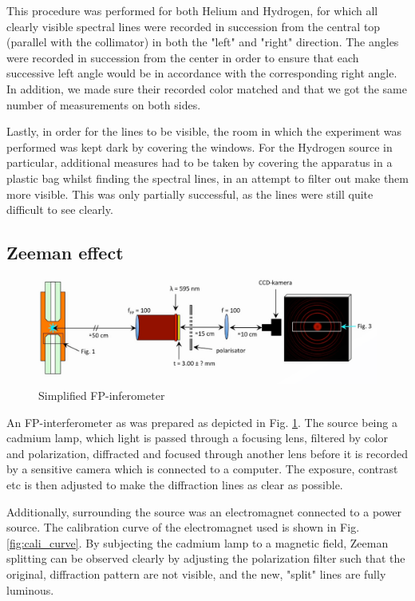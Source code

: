 \documentclass[11pt,a4paper]{article}
\begin{document}
    This procedure was performed for both Helium and Hydrogen, for which all clearly visible spectral lines were recorded in succession from the central top (parallel with the collimator) in both the "left" and "right" direction. The angles were recorded in succession from the center in order to ensure that each successive left angle would be in accordance with the corresponding right angle. In addition, we made sure their recorded color matched and that we got the same number of measurements on both sides.

    Lastly, in order for the lines to be visible, the room in which the experiment was performed was kept dark by covering the windows. For the Hydrogen source in particular, additional measures had to be taken by covering the apparatus in a plastic bag whilst finding the spectral lines, in an attempt to filter out make them more visible. This was only partially successful, as the lines were still quite difficult to see clearly.

    \subsection{Zeeman effect\label{sect:zeeman_expt}}
      \begin{figure}[H]
        \center
        \includegraphics[width=15cm]{scripts/figs/ZEEMAN_EXPERIMENTAL.png}
        \caption{Simplified FP-inferometer}
        \label{FP-inferometer}
      \end{figure}

      An FP-interferometer as was prepared as depicted in Fig. \ref{FP-inferometer}. The source being a cadmium lamp, which light is passed through a focusing lens, filtered by color and polarization, diffracted and focused through another lens before it is recorded by a sensitive camera which is connected to a computer. The exposure, contrast etc is then adjusted to make the diffraction lines as clear as possible.

      Additionally, surrounding the source was an electromagnet connected to a power source. The calibration curve of the electromagnet used is shown in Fig. \ref{fig:cali_curve}. By subjecting the cadmium lamp to a magnetic field, Zeeman splitting can be observed clearly by adjusting the polarization filter such that the original, diffraction pattern are not visible, and the new, "split" lines are fully luminous.
\end{document}

